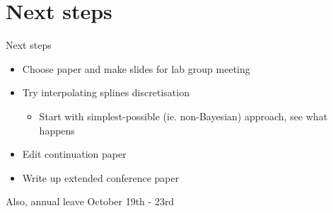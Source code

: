 \documentclass[presentation]{beamer}
\begin{document}
\section{Next steps}
\label{sec:orgc41bada}
\begin{frame}[label={sec:org7bab0ab}]{Next steps}
\begin{itemize}
\item Choose paper and make slides for lab group meeting
\end{itemize}
\vfill
\begin{itemize}
\item Try interpolating splines discretisation
\begin{itemize}
\item Start with simplest-possible (ie. non-Bayesian) approach, see what happens
\end{itemize}
\end{itemize}
\vfill
\begin{itemize}
\item Edit continuation paper
\end{itemize}
\vfill
\begin{itemize}
\item Write up extended conference paper
\end{itemize}
\vfill
Also, annual leave October 19th - 23rd
\end{frame}
\end{document}
